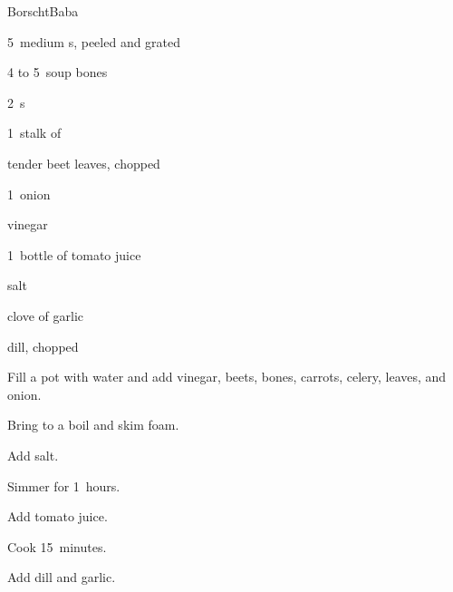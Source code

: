 \begin{recipe}{Borscht}{Baba}{}

\begin{ingredients}
\item 5~medium s, peeled and grated
\item 4 to 5~soup bones
\item 2~s
\item 1~stalk of 
\item tender beet leaves, chopped
\item 1~onion
\item {} vinegar
\item 1~bottle of tomato juice
\item {} salt
\item clove of garlic
\item dill, chopped
\end{ingredients}

\begin{directions}
\item Fill a pot with water and add vinegar, beets, bones, carrots, celery, leaves, and onion.
\item Bring to a boil and skim foam.
\item Add salt.
\item Simmer for 1\half~hours.
\item Add tomato juice.
\item Cook 15~minutes.
\item Add dill and garlic.
\end{directions}

\end{recipe}
